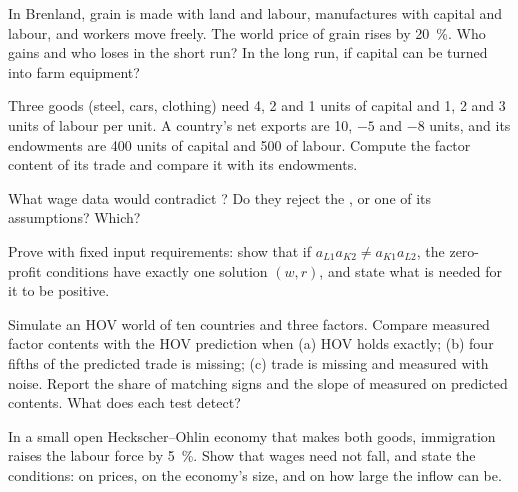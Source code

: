 \begin{exercise}[$\star\star$]\label{exo:b3:factor-endowments:7}
In Brenland, grain is made with land and labour, manufactures with capital and
labour, and workers move freely. The world price of grain rises by 20~\%. Who gains
and who loses in the short run? In the long run, if capital can be turned into
farm equipment?
\end{exercise}

\begin{exercise}[$\star\star$]\label{exo:b3:factor-endowments:8}
Three goods (steel, cars, clothing) need 4, 2 and 1 units of capital and 1, 2 and
3 units of labour per unit. A country's net exports are 10, $-5$ and $-8$ units, and
its endowments are 400 units of capital and 500 of labour. Compute the factor
content of its trade and compare it with its endowments.
\end{exercise}

\begin{exercise}[$\star\star$]\label{exo:b3:factor-endowments:9}
What wage data would contradict ? Do they reject the
, or one of its assumptions? Which?
\end{exercise}

\begin{exercise}[$\star\star\star$]\label{exo:b3:factor-endowments:10}
Prove  with fixed input requirements: show that if
$a_{L1}a_{K2} \ne a_{K1}a_{L2}$, the zero-profit conditions have exactly one solution
$(w, r)$, and state what is needed for it to be positive.
\end{exercise}

\begin{exercise}[$\star\star\star$]\label{exo:b3:factor-endowments:11}
Simulate an HOV world of ten countries and three factors. Compare measured
factor contents with the HOV prediction when (a) HOV holds exactly; (b) four
fifths of the predicted trade is missing; (c) trade is missing and measured with
noise. Report the share of matching signs and the slope of measured on
predicted contents. What does each test detect?
\end{exercise}

\begin{exercise}[$\star\star\star$]\label{exo:b3:factor-endowments:12}
In a small open Heckscher--Ohlin economy that makes both goods, immigration raises
the labour force by 5~\%. Show that wages need not fall, and state the conditions:
on prices, on the economy's size, and on how large the inflow can be.
\end{exercise}

